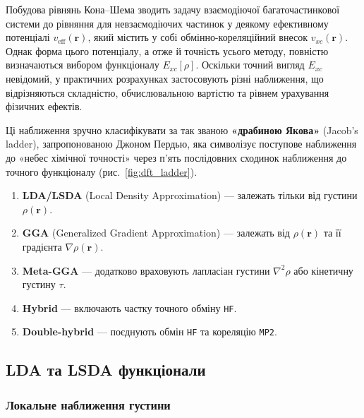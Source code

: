 \begin{wrapstuff}[o,3,type=figure, width=0.4\linewidth]%
\centering

\caption{Драбина Якова\\ (Jacob’s ladder).}
\label{fig:dft_ladder}
\end{wrapstuff}
Побудова рівнянь Кона--Шема зводить задачу взаємодіючої багаточастинкової системи до рівняння для невзаємодіючих частинок у деякому ефективному потенціалі $v_{\text{eff}}(\mathbf{r})$, який містить у собі обмінно-кореляційний внесок $v_{xc}(\mathbf{r})$.
Однак форма цього потенціалу, а отже й точність усього методу, повністю визначаються вибором функціоналу $E_{xc}[\rho]$.
Оскільки точний вигляд $E_{xc}$ невідомий, у практичних розрахунках застосовують різні наближення, що відрізняються складністю, обчислювальною вартістю та рівнем урахування фізичних ефектів.


Ці наближення зручно класифікувати за так званою \textbf{«драбиною Якова»} (Jacob’s ladder), запропонованою Джоном Пердью, яка символізує поступове наближення до «небес хімічної точності» через п’ять послідовних сходинок наближення до точного функціоналу (рис.~\ref{fig:dft_ladder}).

\begin{enumerate}
    \item \textbf{LDA/LSDA} (Local Density Approximation) --- залежать тільки від густини $\rho(\mathbf{r})$.
    \item \textbf{GGA} (Generalized Gradient Approximation) --- залежать від $\rho(\mathbf{r})$ та її градієнта $\nabla\rho(\mathbf{r})$.
    \item \textbf{Meta-GGA} --- додатково враховують лапласіан густини $\nabla^2\rho$ або кінетичну густину $\tau$.
    \item \textbf{Hybrid} --- включають частку точного обміну \texttt{HF}.
    \item \textbf{Double-hybrid} --- поєднують обмін \texttt{HF} та кореляцію \texttt{MP2}.
\end{enumerate}


\subsection{LDA та LSDA функціонали}

\subsubsection{Локальне наближення густини}

